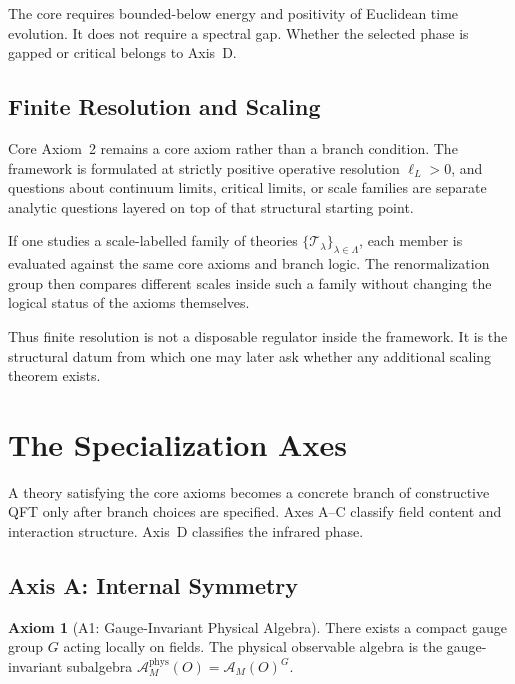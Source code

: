 \documentclass[12pt,a4paper]{article}
\theoremstyle{plain}
\theoremstyle{definition}
\newtheorem{axiom}[theorem]{Axiom}
\theoremstyle{remark}
\newcommand{\alg}{\mathcal{A}}
\begin{document}
The core requires bounded-below energy and positivity of Euclidean
time evolution. It does not require a spectral gap. Whether the
selected phase is gapped or critical belongs to Axis~D.


\subsection{Finite Resolution and Scaling}

Core Axiom~2 remains a core axiom rather than a branch condition. The
framework is formulated at strictly positive operative resolution
$\ell_L > 0$, and questions about continuum limits, critical limits,
or scale families are separate analytic questions layered on top of
that structural starting point.

If one studies a scale-labelled family of theories
$\{\mathcal{T}_\lambda\}_{\lambda \in \Lambda}$, each member is
evaluated against the same core axioms and branch logic. The
renormalization group then compares different scales inside such a
family without changing the logical status of the axioms themselves.

Thus finite resolution is not a disposable regulator inside the
framework. It is the structural datum from which one may later ask
whether any additional scaling theorem exists.


\section{The Specialization Axes}
\label{sec:axes}

A theory satisfying the core axioms becomes a concrete branch of
constructive QFT only after branch choices are specified. Axes A--C
classify field content and interaction structure. Axis~D classifies
the infrared phase.


\subsection{Axis A: Internal Symmetry}

\begin{axiom}[A1: Gauge-Invariant Physical Algebra]\label{ax:A1}
  There exists a compact gauge group $G$ acting locally on fields. The
  physical observable algebra is the gauge-invariant subalgebra
  $\alg^{\mathrm{phys}}_M(O) = \alg_M(O)^G$.
\end{axiom}
\end{document}
